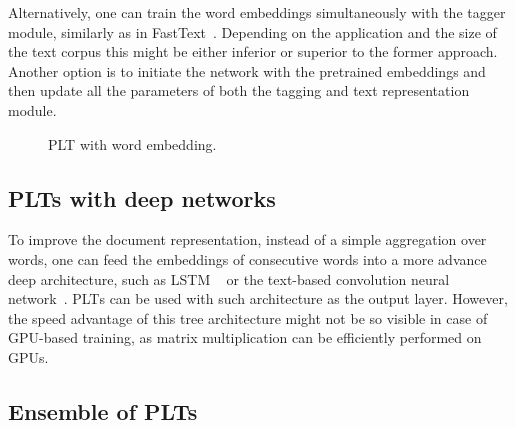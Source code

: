 \documentclass{article}
\newcommand{\Algo}[1]{\textsc{#1}}
\newcommand{\sectionBefore}{-0pt}
\newcommand{\sectionAfter}{-0pt}
\begin{document}
Alternatively, one can train the word embeddings simultaneously with the tagger module, similarly as in FastText~\citep{Joulin_et_al_2016}. Depending on the application and the size of the text corpus this might be either inferior or superior to the former approach. Another option is to initiate the network with the pretrained embeddings and then update all the parameters of both the tagging and text representation module. 

\begin{figure}
	\begin{center}
		
	\end{center}
	\caption{PLT with word embedding.}
	\label{pic:model-embedding}
\end{figure}



\vspace{\sectionBefore}
\subsection{PLTs with deep networks}
\label{sec:plt-deep}
\vspace{\sectionAfter}

To improve the document representation, instead of a simple aggregation over words, one can feed the embeddings of consecutive words into a more advance deep architecture, such as LSTM ~\citep{Hochreiter_Schmidhuber_1997} or the text-based convolution neural network~\cite{Liu_et_al_2017}. \Algo{PLT}s can be used with such architecture as the output layer. However, the speed advantage of this tree architecture might not be so visible in case of GPU-based training, as matrix multiplication can be efficiently performed on GPUs. 

\vspace{\sectionBefore}
\subsection{Ensemble of PLTs}
\label{sec:plt-ensemble}
\vspace{\sectionAfter}
\end{document}
